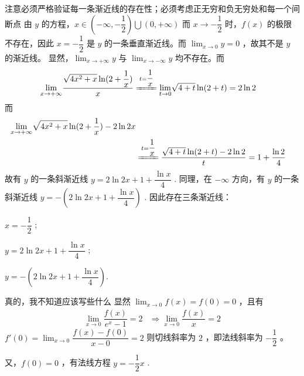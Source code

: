 \begin{answer}[660T48]{注意必须严格验证每一条渐近线的存在性；必须考虑正无穷和负无穷处和每一个间断点}
    由 $ y $ 的方程，$ x \in (-\infty,-\dfrac{1}{2})\bigcup (0,+\infty) $
    而 $ x \rightarrow -\dfrac{1}{2} $ 时，$ f(x) $ 的极限不存在，因此 $ x = -\dfrac{1}{2} $ 是
    $ y $ 的一条垂直渐近线。而 $ {\displaystyle\lim_{x\rightarrow 0}}y = 0 $ ，故其不是 $ y $ 的渐近线。
    显然，$ {\displaystyle\lim_{x\rightarrow +\infty}}y $ 与 $ {\displaystyle\lim_{x\rightarrow -\infty}}y $ 
    均不存在。而
    \begin{equation*}
        \begin{aligned}
            {\displaystyle\lim_{x\rightarrow +\infty}}\dfrac{\sqrt{4x^2+x}\ln (2+\dfrac{1}{x})}{x}
            &\xlongequal{t = \dfrac{1}{x}}
            {\displaystyle\lim_{t\rightarrow 0}}\sqrt{4+t}\ln(2+t) = 2\ln 2
        \end{aligned}
    \end{equation*}
    而
    \begin{equation*}
        \begin{aligned}
            {\displaystyle\lim_{x\rightarrow +\infty}}\sqrt{4x^2+x}\ln (2+\dfrac{1}{x})-2\ln 2x
            \\&\xlongequal{t = \dfrac{1}{x}} \dfrac{\sqrt{4+t}\ln (2+t)-2\ln 2}{t} = 1+ \dfrac{\ln 2}{4}
        \end{aligned}
    \end{equation*}
    故有 $ y $ 的一条斜渐近线 $ y = 2\ln 2 x + 1 + \dfrac{\ln x}{4} $ .
    同理，在 $ -\infty $ 方向，有 $ y $ 的一条斜渐近线 $ y = -(2\ln 2 x + 1 + \dfrac{\ln x}{4}) $ .
    因此存在三条渐近线：
    \begin{BulletItemize}
        \item[\textbullet] $ x = -\dfrac{1}{2} $ ;
        \item[\textbullet] $ y = 2\ln 2 x + 1 + \dfrac{\ln x}{4} $ ;
        \item[\textbullet] $ y = -(2\ln 2 x + 1 + \dfrac{\ln x}{4}) $.
    \end{BulletItemize}
\end{answer}

\begin{answer}[660T49]{真的，我不知道应该写些什么}
    显然 $ {\displaystyle\lim_{x\rightarrow 0}}f(x) = f(0) = 0 $ ，且有
    \begin{equation*}
        \begin{aligned}
            {\displaystyle\lim_{x\rightarrow 0}}\dfrac{f(x)}{e^x - 1} = 2 &\Rightarrow
            {\displaystyle\lim_{x\rightarrow 0}}\dfrac{f(x)}{x} = 2
        \end{aligned}
    \end{equation*}
    $ f'(0) = {\displaystyle\lim_{x\rightarrow 0}}\dfrac{f(x) - f(0)}{x - 0} = 2 $ 
    则切线斜率为 $ 2 $ ，即法线斜率为 $ -\dfrac{1}{2} $ 。
    
    又，$ f(0) = 0 $ ，有法线方程
    $ y = -\dfrac{1}{2}x $ .
\end{answer}

